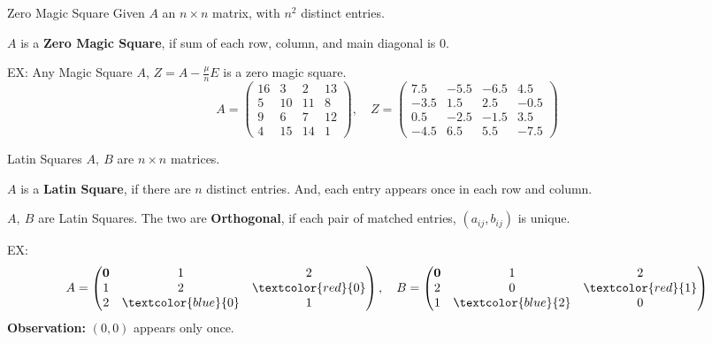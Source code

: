 \documentclass[10pt]{beamer}
\begin{document}
\begin{frame}{Zero Magic Square}
    Given $A$ an $n\times n$ matrix, with $n^2$ distinct entries.
    \begin{definition}
        $A$ is a \textbf{Zero Magic Square}, if sum of each row, column, and main diagonal is $0$.
    \end{definition}

    \hfil

    EX: Any Magic Square $A$, $Z=A-\frac{\mu}{n}E$ is a zero magic square.
    \[A=\begin{pmatrix}
        16&3&2&13\\
        5&10&11&8\\
        9&6&7&12\\
        4&15&14&1
      \end{pmatrix},\quad Z=\begin{pmatrix}
        7.5&-5.5&-6.5&4.5\\
        -3.5&1.5&2.5&-0.5\\
        0.5&-2.5&-1.5&3.5\\
        -4.5&6.5&5.5&-7.5
      \end{pmatrix}\]
\end{frame}
\begin{frame}{Latin Squares}
    $A,\ B$ are $n\times n$ matrices.

    \begin{definition}
        $A$ is a \textbf{Latin Square}, if there are $n$ distinct entries.
        And, each entry appears once in each row and column.
    \end{definition}

    \begin{definition}
        $A,\ B$ are Latin Squares. The two are \textbf{Orthogonal}, if each pair of matched entries, $(a_{ij},b_{ij})$ is unique.
    \end{definition}

    \hfil

    EX:
    \[A=\begin{pmatrix}
        \textbf{0}&1&2\\1&2&\textcolor{red}{0}\\2&\textcolor{blue}{0}&1
    \end{pmatrix},\quad B=\begin{pmatrix}
        \textbf{0}&1&2\\2&0&\textcolor{red}{1}\\1&\textcolor{blue}{2}&0
    \end{pmatrix}\]
    \textbf{Observation:} $(0,0)$ appears only once.
\end{frame}
\end{document}
